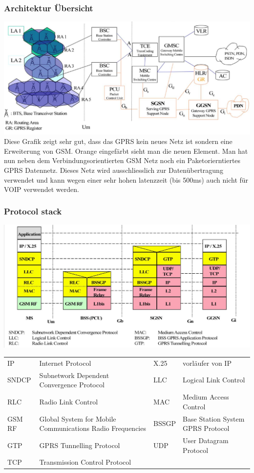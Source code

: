 \subsubsection{Architektur Übersicht}
\includegraphics[width = \linewidth]{./Pics/GPRS.png} \\
Diese Grafik zeigt sehr gut, dass das GPRS kein neues Netz ist sondern eine Erweiterung von GSM. Orange eingefärbt sieht man die neuen Element. Man hat nun neben dem Verbindungsorientierten GSM Netz noch ein Paketorierntiertes GPRS Datennetz. Dieses Netz wird ausschliesslich zur Datenübertragung verwendet und kann wegen einer sehr hohen latenzzeit (bis 500ms) auch nicht für VOIP verwendet werden.

\subsubsection{Protocol stack}
\includegraphics[width = \linewidth]{./Pics/GPRS2.png}

\begin{tabular}{|l|l|l|l|}
\hline
IP & Internet Protocol & X.25 & vorläufer von IP \\
SNDCP & Subnetwork Dependent Convergence Protocol & LLC & Logical Link Control \\
RLC  & Radio Link Control  & MAC & Medium Access Control \\
GSM RF &  Global System for Mobile Communications Radio Frequencies & BSSGP & Base Station System GPRS Protocol \\
GTP & GPRS Tunnelling Protocol & UDP & User Datagram Protocol \\
TCP & Transmission Control Protocol & & \\ 
\hline
\end{tabular}
